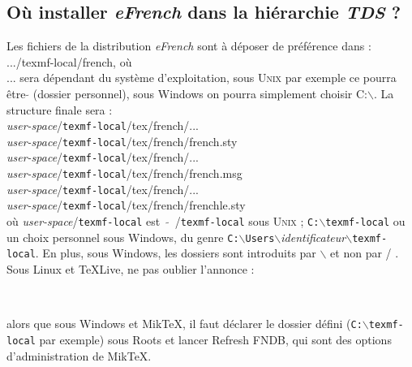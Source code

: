 \documentclass[a4paper,12pt,openright]{article}
\begin{document}
\begin{MAJ}
\subsection{Où installer \textit{eFrench} dans la hiérarchie \textit{TDS} ?}
  Les fichiers de la distribution \textit{eFrench} sont à déposer de
préférence dans :\\
 .../texmf-local/french, où \\
 ... sera dépendant du système d'exploitation,
sous \textsc{Unix} par exemple ce pourra être {\bf$\tilde{ }$} (dossier personnel), 
sous Windows on pourra simplement choisir C:$\backslash$.
La structure finale sera : \\[1ex]
\textit{user-space}/\texttt{texmf-local}/tex/french/...\\
\textit{user-space}/\texttt{texmf-local}/tex/french/french.sty\\
\textit{user-space}/\texttt{texmf-local}/tex/french/...\\
\textit{user-space}/\texttt{texmf-local}/tex/french/french.msg\\
\textit{user-space}/\texttt{texmf-local}/tex/french/...\\
\textit{user-space}/\texttt{texmf-local}/tex/french/frenchle.sty\\
où \textit{user-space}/\texttt{texmf-local} est ~{\bf $\tilde{ }$}~/\texttt{texmf-local} sous \textsc{Unix} ; \texttt{C:$\backslash$texmf-local}
ou un choix personnel sous Windows, du genre 
\texttt{C:$\backslash$Users$\backslash$}\textit{identificateur}\texttt{$\backslash$texmf-local}.
En plus, sous Windows,  les dossiers sont introduits par $\backslash$ et non par / .
Sous Linux et \TeX Live, ne pas oublier l'annonce :
\begin{center}
\\[1ex]
\end{center}
alors que sous Windows et Mik\TeX, il faut déclarer  le dossier défini (\texttt{C:$\backslash$texmf-local} par exemple)
sous {\sc Roots}\label{mikroot} et lancer {\sc Refresh FNDB}, qui sont des options d'administration de Mik\TeX.
\end{MAJ}
\end{document}
